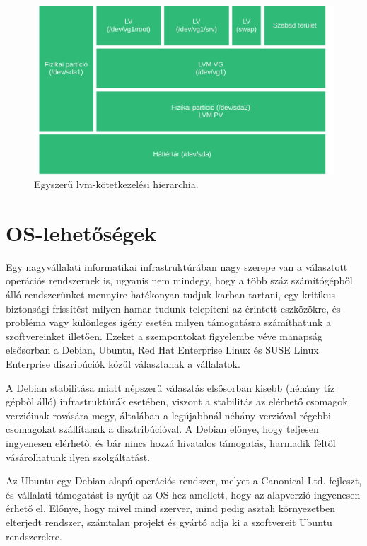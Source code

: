 \begin{figure}[!ht]
	\centering
	\includegraphics[width=14cm]{figures/lvm.pdf}
	\caption{Egyszerű \acrshort{lvm}-kötetkezelési hierarchia.}
	\label{fig:lvm}
\end{figure}

\section{OS-lehetőségek}
Egy nagyvállalati informatikai infrastruktúrában nagy szerepe van a választott operációs rendszernek is, ugyanis nem mindegy, hogy a több száz számítógépből álló rendszerünket mennyire hatékonyan tudjuk karban tartani, egy kritikus biztonsági frissítést milyen hamar tudunk telepíteni az érintett eszközökre, és probléma vagy különleges igény esetén milyen támogatásra számíthatunk a szoftvereinket illetően.
Ezeket a szempontokat figyelembe véve manapság elsősorban a Debian, Ubuntu, Red Hat Enterprise Linux és SUSE Linux Enterprise diszribúciók közül választanak a vállalatok.

A Debian stabilitása miatt népszerű választás elsősorban kisebb (néhány tíz gépből álló) infrastruktúrák esetében, viszont a stabilitás az elérhető csomagok verzióinak rovására megy, általában a legújabbnál néhány verzióval régebbi csomagokat szállítanak a disztribúcióval. A Debian előnye, hogy teljesen ingyenesen elérhető, és bár nincs hozzá hivatalos támogatás, harmadik féltől vásárolhatunk ilyen szolgáltatást.

Az Ubuntu egy Debian-alapú operációs rendszer, melyet a Canonical Ltd. fejleszt, és vállalati támogatást is nyújt az OS-hez amellett, hogy az alapverzió ingyenesen érhető el. Előnye, hogy mivel mind szerver, mind pedig asztali környezetben elterjedt rendszer, számtalan projekt és gyártó adja ki a szoftvereit Ubuntu rendszerekre.

